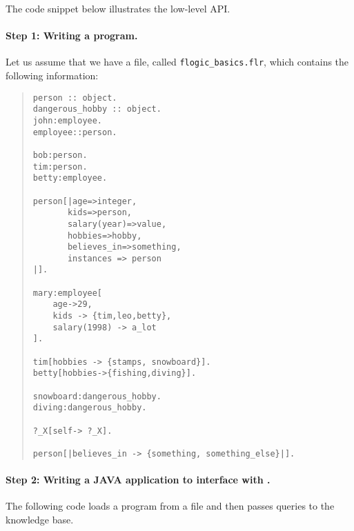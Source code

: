 The code snippet below illustrates the low-level API.

\paragraph{Step 1: Writing a \FLSYSTEM program.}
  Let us assume that we have a file, called  {\tt flogic\_basics.flr},
  which contains the following information:
\begin{quote}
\begin{verbatim}
person :: object.
dangerous_hobby :: object.
john:employee.
employee::person.

bob:person.
tim:person.
betty:employee.

person[|age=>integer,
       kids=>person,
       salary(year)=>value,
       hobbies=>hobby,
       believes_in=>something,
       instances => person
|].

mary:employee[
    age->29,
    kids -> {tim,leo,betty},
    salary(1998) -> a_lot
].

tim[hobbies -> {stamps, snowboard}].
betty[hobbies->{fishing,diving}].

snowboard:dangerous_hobby.
diving:dangerous_hobby.

?_X[self-> ?_X].

person[|believes_in -> {something, something_else}|].
\end{verbatim}
\end{quote}

\paragraph{Step 2:  Writing a JAVA application to interface with \FLSYSTEM.}
 The following code loads a \FLSYSTEM program from a file and then passes
 queries to the knowledge base.

